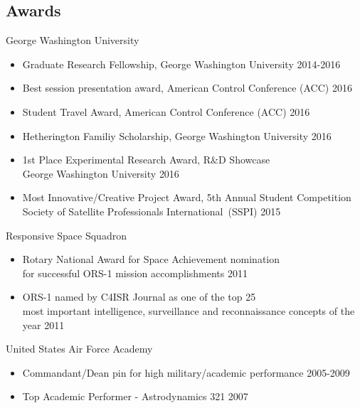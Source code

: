 \subsection*{Awards} %
George Washington University
\begin{itemize}
    \item Graduate Research Fellowship, George Washington University \hfill {2014-2016}
    \item Best session presentation award, American Control Conference (ACC) \hfill {2016}
    \item Student Travel Award, American Control Conference (ACC) \hfill {2016}
    \item Hetherington Familiy Scholarship, George Washington University \hfill {2016}
    \item{1st Place Experimental Research Award, R\&D Showcase\\ George Washington University} \hfill {2016}
    \item {Most Innovative/Creative Project Award, 5th Annual Student Competition \\ 
    Society of Satellite Professionals International~(SSPI) } \hfill {2015}  
\end{itemize}

Responsive Space Squadron
\begin{itemize}
    \item Rotary National Award for Space Achievement nomination \\
    for successful ORS-1 mission accomplishments \hfill {2011} 
    \item ORS-1 named by C4ISR Journal as one of the top 25\\
     most important intelligence, surveillance and reconnaissance concepts of the year \hfill {2011}
\end{itemize}

United States Air Force Academy
\begin{itemize}
\item Commandant/Dean pin for high military/academic performance \hfill {2005-2009}
\item Top Academic Performer - Astrodynamics 321 \hfill {2007}
\end{itemize}
